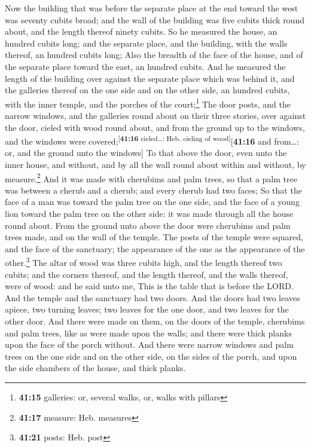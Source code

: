  Now the building that was before the separate place at
the end toward the west was seventy cubits broad; and the wall of the
building was five cubits thick round about, and the length thereof
ninety cubits.  So he measured the house, an hundred
cubits long; and the separate place, and the building, with the walls
thereof, an hundred cubits long;  Also the breadth of the
face of the house, and of the separate place toward the east, an hundred
cubits.  And he measured the length of the building over
against the separate place which was behind it, and the galleries
thereof on the one side and on the other side, an hundred cubits, with
the inner temple, and the porches of the court;\footnote{\textbf{41:15}
  galleries: or, several walks, or, walks with pillars} 
The door posts, and the narrow windows, and the galleries round about on
their three stories, over against the door, cieled with wood round
about, and from the ground up to the windows, and the windows were
covered;\textsuperscript{{[}\textbf{41:16} cieled\ldots: Heb. cieling of
wood{]}}{[}\textbf{41:16} and from\ldots: or, and the ground unto the
windows{]}  To that above the door, even unto the inner
house, and without, and by all the wall round about within and without,
by measure.\footnote{\textbf{41:17} measure: Heb. measures}
 And it was made with cherubims and palm trees, so that a
palm tree was between a cherub and a cherub; and every cherub had two
faces;  So that the face of a man was toward the palm
tree on the one side, and the face of a young lion toward the palm tree
on the other side: it was made through all the house round about.
 From the ground unto above the door were cherubims and
palm trees made, and on the wall of the temple.  The
posts of the temple were squared, and the face of the sanctuary; the
appearance of the one as the appearance of the other.\footnote{\textbf{41:21}
  posts: Heb. post}  The altar of wood was three cubits
high, and the length thereof two cubits; and the corners thereof, and
the length thereof, and the walls thereof, were of wood: and he said
unto me, This is the table that is before the LORD.  And
the temple and the sanctuary had two doors.  And the
doors had two leaves apiece, two turning leaves; two leaves for the one
door, and two leaves for the other door.  And there were
made on them, on the doors of the temple, cherubims and palm trees, like
as were made upon the walls; and there were thick planks upon the face
of the porch without.  And there were narrow windows and
palm trees on the one side and on the other side, on the sides of the
porch, and upon the side chambers of the house, and thick planks.


